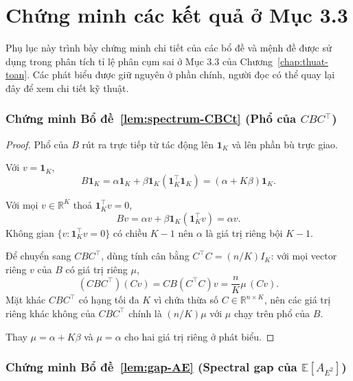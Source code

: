 
\chapter{Chứng minh các kết quả ở Mục 3.3}
\label{appx:proofs-misclustering}

Phụ lục này trình bày chứng minh chi tiết của các bổ đề và mệnh đề được sử dụng trong phân tích tỉ lệ phân cụm sai ở Mục 3.3 của Chương~\ref{chap:thuat-toan}. Các phát biểu được giữ nguyên ở phần chính, người đọc có thể quay lại đây để xem chi tiết kỹ thuật.

\subsection*{Chứng minh Bổ đề~\ref{lem:spectrum-CBCt} (Phổ của $CBC^\top$)}

\begin{proof}
Phổ của $B$ rút ra trực tiếp từ tác động lên $\mathbf{1}_K$ và lên phần bù trực giao.

Với $v = \mathbf{1}_K$,
\[
    B \mathbf{1}_K = \alpha \mathbf{1}_K + \beta \mathbf{1}_K (\mathbf{1}_K^\top \mathbf{1}_K) = (\alpha + K \beta) \mathbf{1}_K.
\]

Với mọi $v \in \mathbb{R}^K$ thoả $\mathbf{1}_K^\top v = 0$,
\[
    B v = \alpha v + \beta \mathbf{1}_K (\mathbf{1}_K^\top v) = \alpha v.
\]
Không gian $\{v : \mathbf{1}_K^\top v = 0\}$ có chiều $K-1$ nên $\alpha$ là giá trị riêng bội $K-1$.

Để chuyển sang $CBC^\top$, dùng tính cân bằng $C^\top C = (n/K) I_K$: với mọi vector riêng $v$ của $B$ có giá trị riêng $\mu$,
\[
    (C B C^\top)(C v) = C B (C^\top C) v = \frac{n}{K} \mu \, (C v).
\]
Mặt khác $CBC^\top$ có hạng tối đa $K$ vì chứa thừa số $C \in \mathbb{R}^{n \times K}$, nên các giá trị riêng khác không của $CBC^\top$ chính là $(n/K) \mu$ với $\mu$ chạy trên phổ của $B$.

Thay $\mu = \alpha + K\beta$ và $\mu = \alpha$ cho hai giá trị riêng ở phát biểu.
\end{proof}

\subsection*{Chứng minh Bổ đề~\ref{lem:gap-AE} (Spectral gap của $\mathbb{E}[A_{E^2}]$)}

